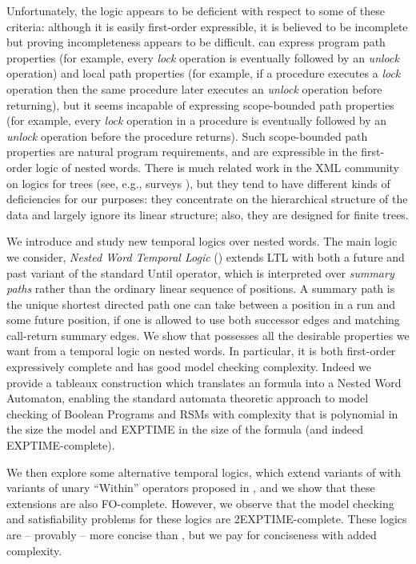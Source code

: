 \documentclass{LMCS}
\theoremstyle{plain}
\theoremstyle{definition}
\newcommand{\caret}{\text{CaRet}}
\newcounter{example}
\begin{document}
Unfortunately, the logic \caret{} appears to be deficient with respect
to some of these criteria: although it is easily first-order
expressible, it is believed to be incomplete but
proving incompleteness 
appears to be difficult.  
\caret{}  can express
program 
path properties (for example, every {\it lock\/} operation is
eventually followed by an {\em unlock\/} operation) and local path
properties (for example, if a procedure executes a {\em lock\/}
operation then the same procedure later executes an {\em unlock\/}
operation before returning), but it seems incapable of expressing
scope-bounded path properties (for example, every {\it lock\/}
operation in a procedure is eventually followed by an {\em unlock\/}
operation before the procedure returns).  Such scope-bounded path
properties are natural program requirements, and are expressible in
the first-order logic of nested words.  There is much related work in
the XML community on logics for trees (see, e.g., surveys
\cite{KSS03,Lib05,vianu-pods}), but they tend to have different kinds
of deficiencies for our purposes: they concentrate on the hierarchical
structure of the data and largely ignore its linear structure; also,
they are designed for finite trees.


We introduce and study new temporal logics over nested
words.  The main logic we consider, \emph{Nested Word Temporal Logic}
() extends LTL with both a future and past variant of the
standard Until operator, which is interpreted over {\em summary paths}
rather than the ordinary linear sequence of positions.  A summary
path is the unique shortest directed path one can take
between a position in a run and some future position, if one is
allowed to use both successor edges and matching call-return
summary edges.  We show that  possesses all the desirable
properties we want from a temporal logic on nested words.  In
particular, it is both first-order expressively complete and has good
model checking complexity.  Indeed we provide a tableaux construction
which translates an  formula into a Nested Word Automaton,
enabling the standard automata theoretic approach to model checking of
Boolean Programs and RSMs with complexity that is polynomial in the
size the model and EXPTIME in the size of the formula (and indeed
EXPTIME-complete). 


We then explore some alternative temporal logics, which extend
variants of \caret{} with variants of unary ``Within'' operators
proposed in \cite{AEM04}, and we show that these extensions are also
FO-complete.  However, we observe that the model checking and
satisfiability problems for these logics are 2EXPTIME-complete.  
These logics are -- provably -- more concise than , but we pay
for conciseness with added complexity.
\end{document}
